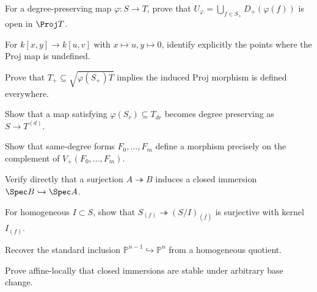 \begin{exercise}\label{exr:vi38-01}
For a degree-preserving map \(\varphi:S\to T\), prove that \(U_\varphi=\bigcup_{f\in S_+}D_+(\varphi(f))\) is open in \(\Proj T\).
\end{exercise}

\begin{exercise}\label{exr:vi38-02}
For \(k[x,y]\to k[u,v]\) with \(x\mapsto u,y\mapsto0\), identify explicitly the points where the Proj map is undefined.
\end{exercise}

\begin{exercise}\label{exr:vi38-03}
Prove that \(T_+\subseteq\sqrt{\varphi(S_+)T}\) implies the induced Proj morphism is defined everywhere.
\end{exercise}

\begin{exercise}\label{exr:vi38-04}
Show that a map satisfying \(\varphi(S_r)\subseteq T_{dr}\) becomes degree preserving as \(S\to T^{(d)}\).
\end{exercise}

\begin{exercise}\label{exr:vi38-05}
Show that same-degree forms \(F_0,\ldots,F_m\) define a morphism precisely on the complement of \(V_+(F_0,\ldots,F_m)\).
\end{exercise}

\begin{exercise}\label{exr:vi38-06}
Verify directly that a surjection \(A\twoheadrightarrow B\) induces a closed immersion \(\Spec B\hookrightarrow\Spec A\).
\end{exercise}

\begin{exercise}\label{exr:vi38-07}
For homogeneous \(I\subset S\), show that \(S_{(f)}\twoheadrightarrow(S/I)_{(\bar f)}\) is surjective with kernel \(I_{(f)}\).
\end{exercise}

\begin{exercise}\label{exr:vi38-08}
Recover the standard inclusion \(\mathbb P^{n-1}\hookrightarrow\mathbb P^n\) from a homogeneous quotient.
\end{exercise}

\begin{exercise}\label{exr:vi38-09}
Prove affine-locally that closed immersions are stable under arbitrary base change.
\end{exercise}

